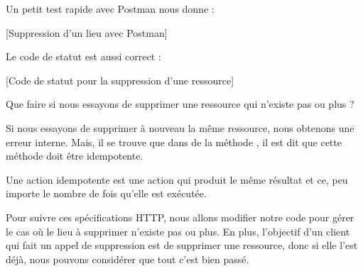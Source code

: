 \documentclass[big]{zmdocument}
\begin{document}
Un petit test rapide avec Postman nous donne :



[Suppression d'un lieu avec Postman]


Le code de statut est aussi correct :



[Code de statut pour la suppression d'une ressource]


\begin{Question}
Que faire si nous essayons de supprimer une ressource qui n'existe pas ou plus ?
\end{Question}


Si nous essayons de supprimer à nouveau la même ressource, nous obtenons une erreur interne. Mais, il se trouve que dans  de la méthode , il est dit que cette méthode doit être idempotente.



\begin{Information}
Une action idempotente est une action qui produit le même résultat et ce, peu importe le nombre de fois qu'elle est exécutée.
\end{Information}


Pour suivre ces spécifications HTTP, nous allons modifier notre code pour gérer le cas où le lieu à supprimer n'existe pas ou plus. En plus, l'objectif d'un client qui fait un appel de suppression est de supprimer une ressource, donc si elle l'est déjà, nous pouvons considérer que tout c'est bien passé.



\end{document}
